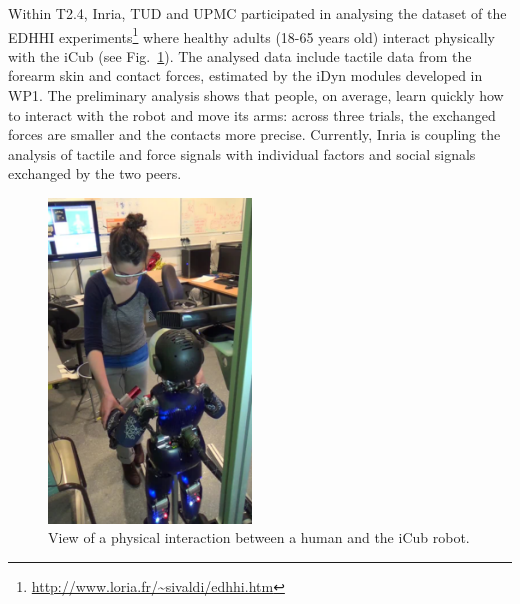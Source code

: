 

Within T2.4, Inria, TUD and UPMC participated in analysing the dataset of the EDHHI experiments\footnote{\url{http://www.loria.fr/~sivaldi/edhhi.htm}} where healthy adults (18-65 years old) interact physically with the iCub (see  Fig.~\ref{fig:eddhi_picture}). The analysed data include tactile data from the forearm skin and contact forces, estimated by the iDyn modules developed in WP1. The preliminary analysis shows that people, on average, learn quickly how to interact with the robot and move its arms: across three trials, the exchanged forces are smaller and the contacts more precise. Currently, Inria is coupling the analysis of tactile and force signals with individual factors and social signals exchanged by the two peers.

\begin{figure}
  \begin{center}
    \includegraphics[width=0.48\textwidth]{pics_UPMC/eddhi_illustration}
  \end{center}
  \caption{View of a physical interaction between a human and the iCub robot.}
 \label{fig:eddhi_picture}
\end{figure}

